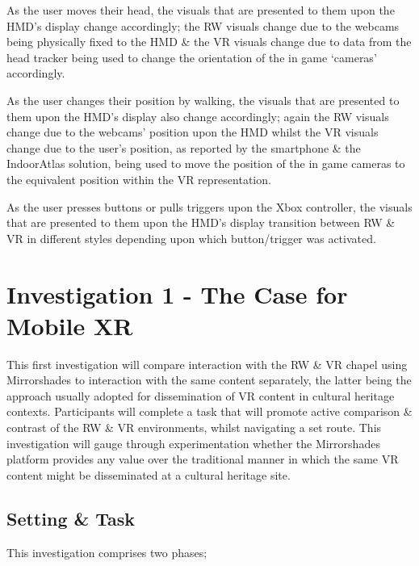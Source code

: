 \documentclass[oneside]{book}
\begin{document}
As the user moves their head, the visuals that are presented to them upon the HMD's display change accordingly; the RW visuals change due to the webcams being physically fixed to the HMD \& the VR visuals change due to data from the head tracker being used to change the orientation of the in game `cameras' accordingly.

As the user changes their position by walking, the visuals that are presented to them upon the HMD's display also change accordingly; again the RW visuals change due to the webcams' position upon the HMD whilst the VR visuals change due to the user's position, as reported by the smartphone \& the IndoorAtlas solution, being used to move the position of the in game cameras to the equivalent position within the VR representation.

As the user presses buttons or pulls triggers upon the Xbox controller, the visuals that are presented to them upon the HMD's display transition between RW \& VR in different styles depending upon which button/trigger was activated.


\chapter{Investigation 1 - The Case for Mobile XR}
\label{investigation1}
This first investigation will compare interaction with the RW \& VR chapel using Mirrorshades to interaction with the same content separately, the latter being the approach usually adopted for dissemination of VR content in cultural heritage contexts. Participants will complete a task that will promote active comparison \& contrast of the RW \& VR environments, whilst navigating a set route. This investigation will gauge through experimentation whether the Mirrorshades platform provides any value over the traditional manner in which the same VR content might be disseminated at a cultural heritage site.


\section{Setting \& Task}
This investigation comprises two phases;
\end{document}
